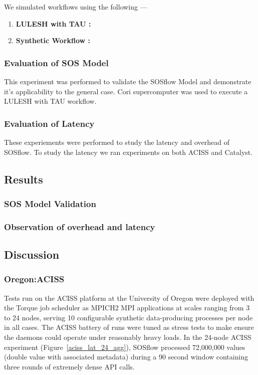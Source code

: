 We simulated workflows using the following --- 
\begin{enumerate}
\item \textbf{LULESH with TAU : }
\item \textbf{Synthetic Workflow :} 
\end{enumerate}


\subsubsection{Evaluation of SOS Model}
This experiment was performed to validate the SOSflow Model and demonstrate it's 
applicability to the general case. 
%
Cori supercomputer was used to execute a LULESH with TAU workflow. 
%

\subsubsection{Evaluation of Latency}
These experiements were performed to study the latency and overhead of SOSflow. 
%
To study the latency we ran experiments on both ACISS and Catalyst. 
% 


\subsection{Results}

\subsubsection{SOS Model Validation}

\subsubsection{Observation of overhead and latency}


\subsection{Discussion}


\subsubsection{Oregon:ACISS} %
Tests run on the ACISS platform at the University of Oregon were
deployed with the Torque job scheduler as MPICH2 MPI applications at
scales ranging from 3 to 24 nodes, serving 10 configurable synthetic
data-producing processes per node in all cases.
%
The ACISS battery of runs were tuned as stress tests to make ensure
the daemons could operate under reasonably heavy loads.
%
In the 24-node ACISS experiment (Figure~\ref{aciss_lat_24_agg}),
SOSflow processed 72,000,000 values (double value with associated metadata) during a 90 second window
containing three rounds of extremely dense API calls.
%
%
